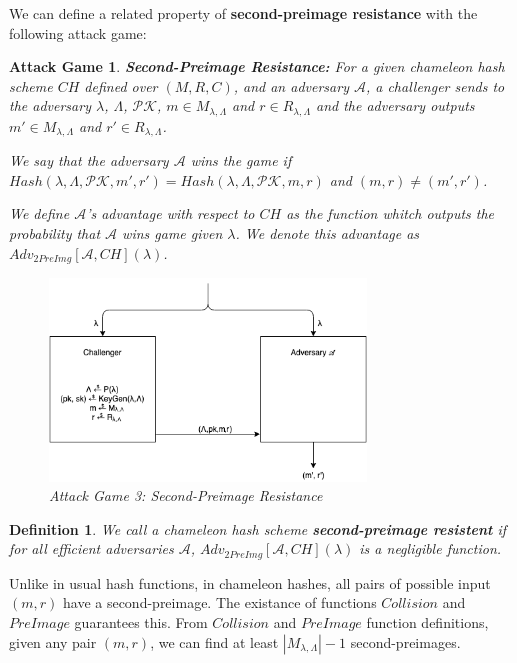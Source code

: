 \documentclass[a4paper]{article}
\newtheorem{definicao}{Definition}
\newtheorem{game}{Attack Game}
\begin{document}
    We can define a related property of \textbf{second-preimage
    resistance} with the following attack game:
    
    \begin{game}
    \textbf{Second-Preimage Resistance: }For a given chameleon hash scheme
    $CH$ defined over $(M, R, C)$, and an adversary $\mathcal{A}$,
    a challenger sends to the adversary $\lambda$, $\Lambda$,
    $\mathcal{PK}$,  $m \in M_{\lambda,\Lambda}$ and 
    $r \in R_{\lambda,\Lambda}$ and the adversary
    outputs $m' \in M_{\lambda,\Lambda}$ and $r' \in R_{\lambda,\Lambda}$.
    
    We say that the adversary $\mathcal{A}$ wins the game if
    $Hash(\lambda, \Lambda, \mathcal{PK}, m', r') = 
    Hash(\lambda, \Lambda, \mathcal{PK}, m, r)$ and $(m, r) \neq (m', r')$.
    
    We define $\mathcal{A}$'s advantage with respect to $CH$ as the
    function whitch outputs the probability that $\mathcal{A}$ wins 
    game given $\lambda$. We denote this advantage as
    $Adv_{2PreImg}[\mathcal{A},CH](\lambda)$.
    
    \begin{figure}
      \centering
          \includegraphics[width=0.75\textwidth]{imagens/2preimage.png}
      \caption{Attack Game 3: Second-Preimage Resistance}
    \end{figure}
    \end{game}
    
    \begin{definicao}
    We call a chameleon hash scheme \textbf{second-preimage resistent} 
    if for all efficient adversaries $\mathcal{A}$,
    $Adv_{2PreImg}[\mathcal{A},CH](\lambda)$ is a negligible
    function.
    \end{definicao}
    
    Unlike in usual hash functions, in chameleon hashes, all pairs
    of possible input $(m, r)$ have a second-preimage. The existance 
    of functions $Collision$ and $PreImage$ guarantees this. From 
    $Collision$ and $PreImage$ function definitions,
    given any pair $(m, r)$, we can find at least $|M_{\lambda,\Lambda}|-1$
    second-preimages.
    
\end{document}
